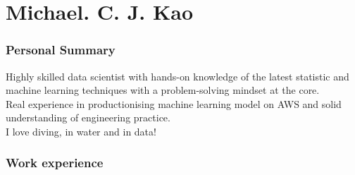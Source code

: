 \documentclass{tccv}
\begin{document}
\part{Michael. C. J. Kao}



\vspace{0.5cm}

\section{Personal Summary}

Highly skilled data scientist with hands-on knowledge of the latest
statistic and machine learning techniques with a problem-solving
mindset at the core.\\

Real experience in productionising machine learning model on AWS and
solid understanding of engineering practice.\\

I love diving, in water and in data!



\section{Work experience}
\end{document}

